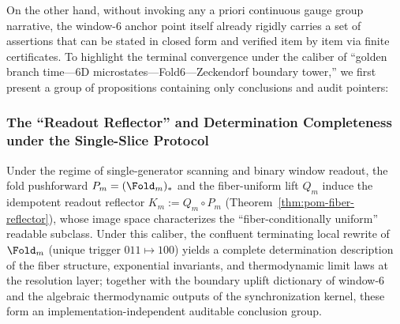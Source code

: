 On the other hand, without invoking any a priori continuous gauge group narrative, the window-\(6\) anchor point itself already rigidly carries a set of assertions that can be stated in closed form and verified item by item via finite certificates.
To highlight the terminal convergence under the caliber of ``golden branch time---6D microstates---Fold6---Zeckendorf boundary tower,'' we first present a group of propositions containing only conclusions and audit pointers:



\subsubsection{The ``Readout Reflector'' and Determination Completeness under the Single-Slice Protocol}\label{subsubsec:single-slice-reflector-completeness}
Under the regime of single-generator scanning and binary window readout, the fold pushforward \(P_m=(\Fold_m)_*\) and the fiber-uniform lift \(Q_m\) induce the idempotent readout reflector
\(
K_m:=Q_m\circ P_m
\)
(Theorem~\ref{thm:pom-fiber-reflector}), whose image space characterizes the ``fiber-conditionally uniform'' readable subclass.
Under this caliber, the confluent terminating local rewrite of \(\Fold_m\) (unique trigger \(011\mapsto 100\)) yields a complete determination description of the fiber structure, exponential invariants, and thermodynamic limit laws at the resolution layer; together with the boundary uplift dictionary of window-\(6\) and the algebraic thermodynamic outputs of the synchronization kernel, these form an implementation-independent auditable conclusion group.

